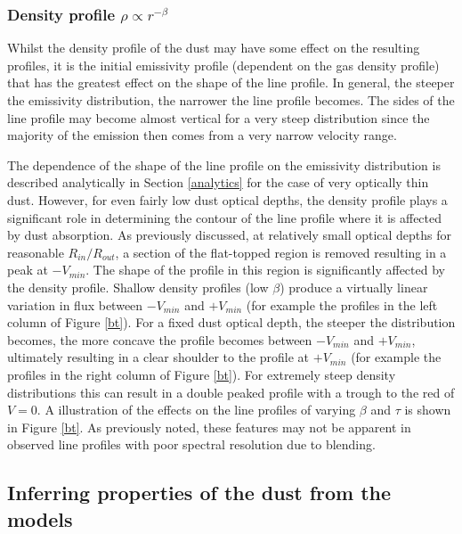 \documentclass[useAMS,usenatbib,usegraphicx]{mnras}
\begin{document}






\subsubsection{Density profile $\rho \propto r^{-\beta}$}
\label{beta}

Whilst the density profile of the dust may have some effect on the 
resulting profiles, it is the initial emissivity profile (dependent on the 
gas density profile) that has the greatest effect on the shape of 
the line profile.  In general, the steeper the emissivity distribution, the narrower the line 
profile becomes.  The sides of the line profile may become almost vertical 
for a very steep distribution since the majority of the emission then 
comes from a very narrow velocity range.  

The dependence of the shape of the line profile on the emissivity distribution
is described analytically in Section \ref{analytics} for the case of very optically thin dust.  However, for even fairly low dust optical depths, the density profile  plays a significant role in determining the contour of the line profile where it is affected by dust absorption.  As previously discussed, at relatively small optical depths for reasonable $R_{in}/R_{out}$, 
a section of the flat-topped region is removed resulting in a peak at 
$-V_{min}$.  The shape of the profile in this region is significantly 
affected by the density profile.  Shallow density profiles (low $\beta$) produce a virtually 
linear variation in flux between $-V_{min}$ and $+V_{min}$ (for example the profiles in the left column of Figure \ref{bt}).  For a fixed dust
optical depth, the steeper the distribution becomes, the more concave the 
profile becomes between $-V_{min}$ and $+V_{min}$, ultimately resulting in 
a clear shoulder to the profile at $+V_{min}$  (for example the profiles in the right column of Figure \ref{bt}).  For extremely steep density
distributions this can result in a double peaked profile with 
a trough to the red of $V=0$.  A illustration of the effects on the line profiles of varying $\beta$ and $\tau$  is shown in Figure \ref{bt}.  As previously noted, these features may not be apparent in observed line profiles with poor spectral resolution due to blending.

\subsection{Inferring properties of the dust from the models}
\end{document}
